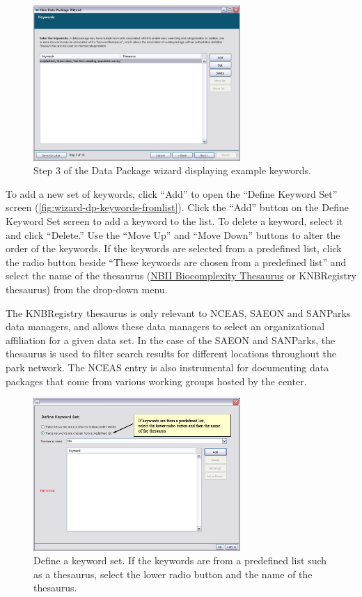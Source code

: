 \begin{figure}
  \centering
    \includegraphics[width=0.7\textwidth]{images/wizard-dp-keywords.jpg}
  \caption{Step 3 of the Data Package wizard displaying example
    keywords.}
  \label{fig:wizard-dp-keywords}
\end{figure}

To add a new set of keywords, click ``Add'' to open the ``Define Keyword
Set'' screen (\autoref{fig:wizard-dp-keywords-fromlist}). Click the
``Add'' button on the Define Keyword Set screen to add a keyword to the
list. To delete a keyword, select it and click ``Delete.''  Use the
``Move Up'' and ``Move Down'' buttons to alter the order of the
keywords. If the keywords are selected from a predefined list, click the
radio button beside ``These keywords are chosen from a predefined list''
and select the name of the thesaurus 
(\href{http://thesaurus.nbii.gov/portal/server.pt}{NBII Biocomplexity
Thesaurus} or KNBRegistry thesaurus) from the drop-down menu. 

The KNBRegistry thesaurus is only relevant to NCEAS, SAEON and SANParks
data managers, and allows these data managers to select an
organizational affiliation for a given data set. In the case of the
SAEON and SANParks, the thesaurus is used to filter search results for
different locations throughout the park network. The NCEAS entry is also
instrumental for documenting data packages that come from various
working groups hosted by the center.

\begin{figure}
  \centering
    \includegraphics[width=0.7\textwidth]{images/wizard-dp-keywords-fromlist.jpg}
  \caption{Define a keyword set. If the keywords are from a predefined
    list such as a thesaurus, select the lower radio button and the name
    of the thesaurus.}
  \label{fig:wizard-dp-keywords-fromlist}
\end{figure}

